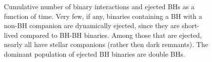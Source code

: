 \documentclass[12pt,preprint]{aastex}
\begin{document}
\begin{figure}[!h]
	\caption{Cumulative number of binary interactions and ejected BHs as a function of time. 
	Very few, if any, binaries containing a BH with a non-BH companion are dynamically ejected, 
	since they are short-lived compared to BH-BH binaries. Among those that are ejected, 
	nearly all have stellar companions (rather then dark remnants). The dominant population
	of ejected BH binaries are double BHs. 
	}
	
	\label{fig:CumBinintEscBHs}
\end{figure}












\end{document}
